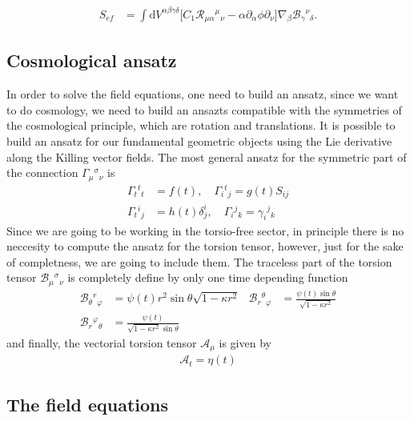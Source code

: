 \documentclass[10pt,a4paper]{article}
\begin{document}
\begin{equation*}
    \begin{split}
      S_{ef}
      & =
      \int  \mathrm{d}V^{\alpha \beta \gamma \delta} \bigg[
      C_1 \mathcal{R}_{\mu\alpha}{}^{\mu}{}_{\nu} - \alpha \partial_{\alpha}\phi \partial_{\nu}
      \bigg]\nabla_\beta \mathcal{B}_{\gamma}{}^{\nu}{}_{\delta}.
    \end{split}
  \end{equation*}


\subsection{Cosmological ansatz}

In order to solve the field equations, one need to build an ansatz, since we want to do cosmology, we need to build an ansazts
compatible with the symmetries of the cosmological principle, which are rotation and translations. It is possible to build an ansatz for our
fundamental geometric objects using the Lie derivative along the Killing vector fields. The most general ansatz for the symmetric part of the 
connection $\Gamma_{\mu}{}^{\sigma}{}_{\nu}$ is
\begin{align}
      \Gamma_{t}{}^{t}{ }_{t} & =f(t), \quad \Gamma_{i}{ }^{t}{ }_{j}=g(t) S_{i j} \\
      \Gamma_{t}{ }^{i}{ }_{j} &= h(t) \delta^{i}_{j}, \quad \Gamma_{i}{ }^{j}{ }_{k}= \gamma_{i}{ }^{j}{ }_{k}
\end{align}
Since we are going to be working in the torsio-free sector, in principle there is no neccesity to compute the ansatz for the torsion tensor, however, just
for the sake of completness, we are going to include them. The traceless part of the torsion tensor $\mathcal{B}_{\mu}{}^{\sigma}{}_{\nu}$ is completely define by only one time depending function
\begin{align*}
    \mathcal{B}_{\theta}{ }^{r}{ }_{\varphi} & = \psi (t) r^2\sin\theta \sqrt{1 - \kappa r^2} &
    \mathcal{B}_{r}{}^{\theta}{}_{\varphi} & =\frac{\psi (t) \sin \theta}{\sqrt{1 - \kappa r^2}} \\
    \mathcal{B}_{r}{}^{\varphi}{}_{\theta} & =\frac{\psi(t)}{ \sqrt{1-\kappa r^{2}} \sin \theta}
\end{align*}
and finally, the vectorial torsion tensor $\mathcal{A}_\mu$ is given by
\begin{align}
    \mathcal{A}_{t} = \eta(t)
\end{align}

\subsection{The field equations}
\end{document}
